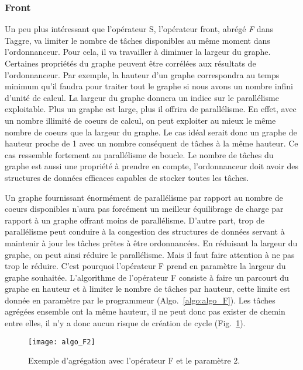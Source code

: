\subsubsection{Front}
Un peu plus intéressant que l'opérateur S, l'opérateur front, abrégé {\em F} dans Taggre, va limiter le nombre de tâches disponibles au même moment dans l'ordonnanceur.
%
Pour cela, il va travailler à diminuer la largeur du graphe.
%
Certaines propriétés du graphe peuvent être corrélées aux résultats de l'ordonnanceur.
%
Par exemple, la hauteur d'un graphe correspondra au temps minimum qu'il faudra pour traiter tout le graphe si nous avons un nombre infini d'unité de calcul.
%
La largeur du graphe donnera un indice sur le parallélisme exploitable.
%
Plus un graphe est large, plus il offrira de parallélisme.
%
En effet, avec un nombre illimité de coeurs de calcul, on peut exploiter au mieux le même nombre de coeurs que la largeur du graphe.
%
Le cas idéal serait donc un graphe de hauteur proche de 1 avec un nombre conséquent de tâches à la même hauteur.
%
Ce cas ressemble fortement au parallélisme de boucle.
%
Le nombre de tâches du graphe est aussi une propriété à prendre en compte, l'ordonnanceur doit avoir des structures de données efficaces capables de stocker toutes les tâches.



Un graphe fournissant énormément de parallélisme par rapport au nombre de coeurs disponibles n'aura pas forcément un meilleur équilibrage de charge par rapport à un graphe offrant moins de parallélisme.
%
D'autre part, trop de parallélisme peut conduire à la congestion des structures de données servant à maintenir à jour les tâches prêtes à être ordonnancées.
%
En réduisant la largeur du graphe, on peut ainsi réduire le parallélisme.
%
Mais il faut faire attention à ne pas trop le réduire.
%
C'est pourquoi l'opérateur F prend en paramètre la largeur du graphe souhaitée.
%
L'algorithme de l'opérateur F consiste à faire un parcourt du graphe en hauteur et à limiter le nombre de tâches par hauteur, cette limite est donnée en paramètre par le programmeur (Algo.~\ref{algo:algo_F}).
%
Les tâches agrégées ensemble ont la même hauteur, il ne peut donc pas exister de chemin entre elles, il n'y a donc aucun risque de création de cycle (Fig.~\ref{fig:algo_F2}).


\begin{figure}[t!]
  \centering
  \texttt{[image: algo\_F2]}
  \caption{Exemple d'agrégation avec l'opérateur F et le paramètre 2.}
  \label{fig:algo_F2}
\end{figure}

